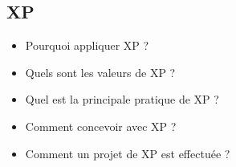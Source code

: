 \subsection{XP}


\begin{itemize}
	\item Pourquoi appliquer XP ?
	\item Quels sont les valeurs de XP ?
	\item Quel est la principale pratique de XP ?
	\item Comment concevoir avec XP ?
	\item Comment un projet de XP est effectuée ?
\end{itemize}